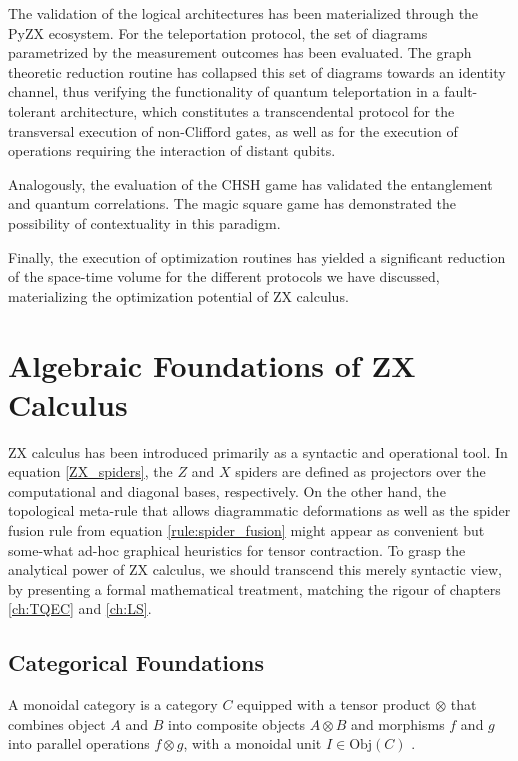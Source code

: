\documentclass[12pt, twoside, openany]{book}
\begin{document}
The validation of the logical architectures has been materialized through the PyZX ecosystem. For the teleportation protocol, the set of diagrams parametrized by the measurement outcomes has been evaluated. The graph theoretic reduction routine has collapsed this set of diagrams towards an identity channel, thus verifying the functionality of quantum teleportation in a fault-tolerant architecture, which constitutes a transcendental protocol for the transversal execution of non-Clifford gates, as well as for the execution of operations requiring the interaction of distant qubits.

Analogously, the evaluation of the CHSH game has validated the entanglement and quantum correlations. The magic square game has demonstrated the possibility of contextuality in this paradigm.

Finally, the execution of optimization routines has yielded a significant reduction of the space-time volume for the different protocols we have discussed, materializing the optimization potential of ZX calculus.

\newpage
\printbibliography

\newpage

\appendix

\chapter{Algebraic Foundations of ZX Calculus} \label{ch:AFZX}

ZX calculus has been introduced primarily as a syntactic and operational tool. In equation \ref{ZX_spiders}, the $Z$ and $X$ spiders are defined as projectors over the computational and diagonal bases, respectively. On the other hand, the topological meta-rule that allows diagrammatic deformations as well as the spider fusion rule from equation \ref{rule:spider_fusion} might appear as convenient but some-what ad-hoc graphical heuristics for tensor contraction. To grasp the analytical power of ZX calculus, we should transcend this merely syntactic view, by presenting a formal mathematical treatment, matching the rigour of chapters \ref{ch:TQEC} and \ref{ch:LS}.

\section*{Categorical Foundations}

\begin{definition}
    A monoidal category is a category $C$ equipped with a tensor product $\otimes$ that combines object $A$ and $B$ into composite objects $A \otimes B$ and morphisms $f$ and $g$ into parallel operations $f \otimes g$, with a monoidal unit $I \in \text{Obj}(C)$ \cite{cowtan2025homologyhopfalgebrasquantum}.
\end{definition}
\end{document}
